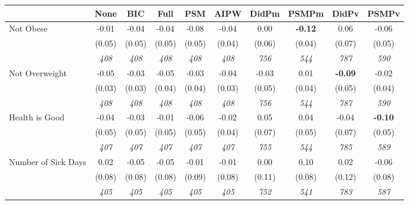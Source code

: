 \begin{tabular}{l c c c c c c c c c}
\toprule
 & None & BIC & Full & PSM & AIPW & DidPm & PSMPm & DidPv & PSMPv \\
\midrule
Not Obese & -0.01 & -0.04 & -0.04 & -0.08 & -0.04 & 0.00 & \textbf{-0.12} & 0.06 & -0.06 \\
& (0.05) & (0.05) & (0.05) & (0.05) & (0.04) & (0.06) & (0.04) & (0.07) & (0.05) \\
& \textit{ 408 } & \textit{ 408 } & \textit{ 408 } & \textit{ 408 } & \textit{ 408 } & \textit{ 756 } & \textit{ 544 } & \textit{ 787 } & \textit{ 590 } \\
Not Overweight & -0.05 & -0.03 & -0.05 & -0.03 & -0.04 & -0.03 & 0.01 & \textbf{ -0.09 } & -0.02 \\
& (0.03) & (0.03) & (0.04) & (0.04) & (0.03) & (0.05) & (0.04) & (0.05) & (0.04) \\
& \textit{ 408 } & \textit{ 408 } & \textit{ 408 } & \textit{ 408 } & \textit{ 408 } & \textit{ 756 } & \textit{ 544 } & \textit{ 787 } & \textit{ 590 } \\
Health is Good & -0.04 & -0.03 & -0.01 & -0.06 & -0.02 & 0.05 & 0.04 & -0.04 & \textbf{-0.10} \\
& (0.05) & (0.05) & (0.05) & (0.05) & (0.04) & (0.07) & (0.05) & (0.07) & (0.05) \\
& \textit{ 407 } & \textit{ 407 } & \textit{ 407 } & \textit{ 407 } & \textit{ 407 } & \textit{ 755 } & \textit{ 544 } & \textit{ 785 } & \textit{ 589 } \\
Number of Sick Days & 0.02 & -0.05 & -0.05 & -0.01 & -0.01 & 0.00 & 0.10 & 0.02 & -0.06 \\
& (0.08) & (0.08) & (0.08) & (0.09) & (0.08) & (0.11) & (0.08) & (0.12) & (0.08) \\
& \textit{ 405 } & \textit{ 405 } & \textit{ 405 } & \textit{ 405 } & \textit{ 405 } & \textit{ 752 } & \textit{ 541 } & \textit{ 783 } & \textit{ 587 } \\
\bottomrule
\end{tabular}
